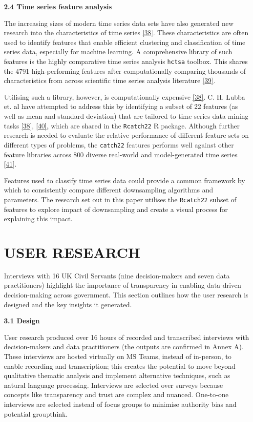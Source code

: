 \documentclass{article}
\begin{document}
\textbf{2.4 Time series feature analysis}

The increasing sizes of modern time series data sets have also generated
new research into the characteristics of time series
\protect\hyperlink{ref-catch22}{{[}38{]}}. These characteristics are
often used to identify features that enable efficient clustering and
classification of time series data, especially for machine learning. A
comprehensive library of such features is the highly comparative time
series analysis \texttt{hctsa} toolbox. This shares the 4791
high-performing features after computationally comparing thousands of
characteristics from across scientific time series analysis literature
\protect\hyperlink{ref-fulcher2017}{{[}39{]}}.

Utilising such a library, however, is computationally expensive
\protect\hyperlink{ref-catch22}{{[}38{]}}. C. H. Lubba et. al have
attempted to address this by identifying a subset of 22 features (as
well as mean and standard deviation) that are tailored to time series
data mining tasks \protect\hyperlink{ref-catch22}{{[}38{]}},
\protect\hyperlink{ref-bagnall}{{[}40{]}}, which are shared in the
\texttt{Rcatch22} R package. Although further research is needed to
evaluate the relative performance of different feature sets on different
types of problems, the \texttt{catch22} features performs well against
other feature libraries across 800 diverse real-world and
model-generated time series \protect\hyperlink{ref-henderson}{{[}41{]}}.

Features used to classify time series data could provide a common
framework by which to consistently compare different downsampling
algorithms and parameters. The research set out in this paper utilises
the \texttt{Rcatch22} subset of features to explore impact of
downsampling and create a visual process for explaining this impact.

\hypertarget{user-research}{%
\section{USER RESEARCH}\label{user-research}}

Interviews with 16 UK Civil Servants (nine decision-makers and seven
data practitioners) highlight the importance of transparency in enabling
data-driven decision-making across government. This section outlines how
the user research is designed and the key insights it generated.

\textbf{3.1 Design}

User research produced over 16 hours of recorded and transcribed
interviews with decision-makers and data practitioners (the outputs are
confirmed in Annex A). These interviews are hosted virtually on MS
Teams, instead of in-person, to enable recording and transcription; this
creates the potential to move beyond qualitative thematic analysis and
implement alternative techniques, such as natural language processing.
Interviews are selected over surveys because concepts like transparency
and trust are complex and nuanced. One-to-one interviews are selected
instead of focus groups to minimise authority bias and potential
groupthink.
\end{document}
